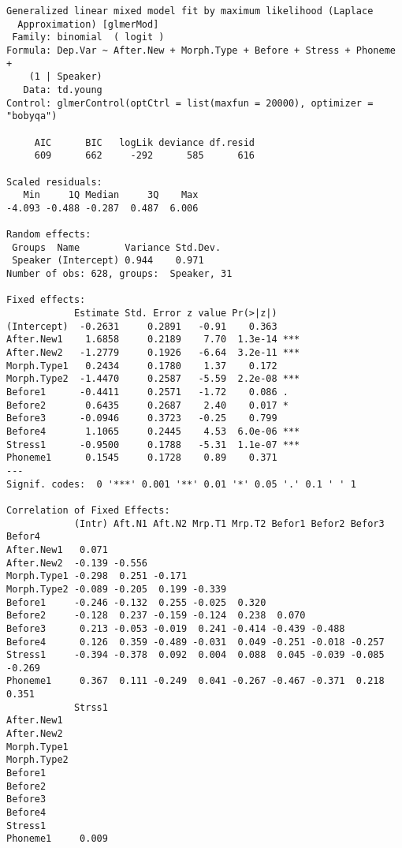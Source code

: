\documentclass[
  10pt,
  letterpaper]{article}
\begin{document}
\begin{verbatim}
Generalized linear mixed model fit by maximum likelihood (Laplace
  Approximation) [glmerMod]
 Family: binomial  ( logit )
Formula: Dep.Var ~ After.New + Morph.Type + Before + Stress + Phoneme +  
    (1 | Speaker)
   Data: td.young
Control: glmerControl(optCtrl = list(maxfun = 20000), optimizer = "bobyqa")

     AIC      BIC   logLik deviance df.resid 
     609      662     -292      585      616 

Scaled residuals: 
   Min     1Q Median     3Q    Max 
-4.093 -0.488 -0.287  0.487  6.006 

Random effects:
 Groups  Name        Variance Std.Dev.
 Speaker (Intercept) 0.944    0.971   
Number of obs: 628, groups:  Speaker, 31

Fixed effects:
            Estimate Std. Error z value Pr(>|z|)    
(Intercept)  -0.2631     0.2891   -0.91    0.363    
After.New1    1.6858     0.2189    7.70  1.3e-14 ***
After.New2   -1.2779     0.1926   -6.64  3.2e-11 ***
Morph.Type1   0.2434     0.1780    1.37    0.172    
Morph.Type2  -1.4470     0.2587   -5.59  2.2e-08 ***
Before1      -0.4411     0.2571   -1.72    0.086 .  
Before2       0.6435     0.2687    2.40    0.017 *  
Before3      -0.0946     0.3723   -0.25    0.799    
Before4       1.1065     0.2445    4.53  6.0e-06 ***
Stress1      -0.9500     0.1788   -5.31  1.1e-07 ***
Phoneme1      0.1545     0.1728    0.89    0.371    
---
Signif. codes:  0 '***' 0.001 '**' 0.01 '*' 0.05 '.' 0.1 ' ' 1

Correlation of Fixed Effects:
            (Intr) Aft.N1 Aft.N2 Mrp.T1 Mrp.T2 Befor1 Befor2 Befor3 Befor4
After.New1   0.071                                                        
After.New2  -0.139 -0.556                                                 
Morph.Type1 -0.298  0.251 -0.171                                          
Morph.Type2 -0.089 -0.205  0.199 -0.339                                   
Before1     -0.246 -0.132  0.255 -0.025  0.320                            
Before2     -0.128  0.237 -0.159 -0.124  0.238  0.070                     
Before3      0.213 -0.053 -0.019  0.241 -0.414 -0.439 -0.488              
Before4      0.126  0.359 -0.489 -0.031  0.049 -0.251 -0.018 -0.257       
Stress1     -0.394 -0.378  0.092  0.004  0.088  0.045 -0.039 -0.085 -0.269
Phoneme1     0.367  0.111 -0.249  0.041 -0.267 -0.467 -0.371  0.218  0.351
            Strss1
After.New1        
After.New2        
Morph.Type1       
Morph.Type2       
Before1           
Before2           
Before3           
Before4           
Stress1           
Phoneme1     0.009
\end{verbatim}
\end{document}
